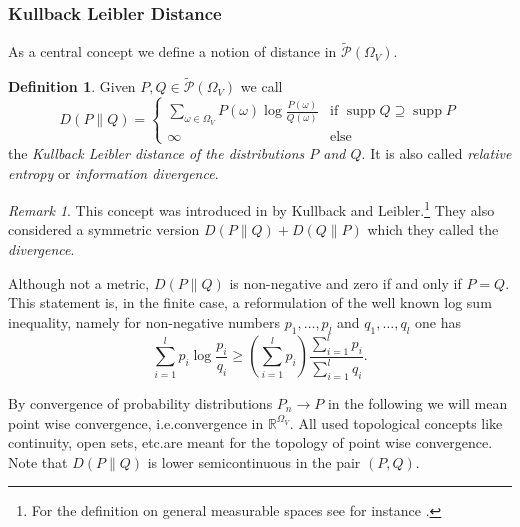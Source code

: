 \documentclass[12pt]{amsart}
\renewcommand{\supset}{\supseteq}
\DeclareMathOperator*{\supp}{supp}
\newcommand{\ie}{i.e.\;}  %
\newcommand{\etc}{etc.\;}
\theoremstyle{plain}%
\theoremstyle{definition}
\newtheorem{defn}[thm]{Definition}
\theoremstyle{remark}
\newtheorem*{rem}{Remark}
\begin{document}
\subsubsection{Kullback Leibler Distance}
As a central concept we define a notion of distance in
$\tilde{\mathcal{P}}(\Omega_V)$.
\begin{defn}\label{sec:kullb-leibl-dist-definition} Given $P,Q \in
  \tilde{\mathcal{P}}(\Omega_V)$ we call
  \begin{equation*}
  \label{eq:finitekullbackleibler}
  D ( P \parallel Q) =
  \begin{cases}
    \sum_{\omega\in\Omega_V} P(\omega) \log\frac{P(\omega)}{Q(\omega)}
    & \text{if } \supp Q \supset \supp P \\
    \infty & \text{else}
  \end{cases}
\end{equation*}
the \emph{Kullback Leibler distance of the distributions $P$ and $Q$}.
 It is also called \emph{relative
  entropy} or \emph{information
  divergence}.
\end{defn}
 
\begin{rem}
  This concept was introduced in \cite{kullbackleibler51} by Kullback
  and Leibler.\footnote{For the definition on general measurable
    spaces see for instance \cite{georgii88}.} They also considered a
  symmetric version $D(P\parallel Q) + D(Q\parallel P)$ which they
  called the \emph{divergence}.
\end{rem} 

Although not a metric, $D(P\parallel Q)$ is non-negative and zero if
and only if $P=Q$.  This statement is, in the finite case, a
reformulation of the well known log sum inequality, namely for
non-negative numbers $p_1,\ldots,p_l$ and $q_1,\ldots,q_l$ one has
\begin{equation*}
  \label{eq:logsuminequality}
  \sum_{i=1}^l p_i \log \frac{p_i}{q_i} \geq \left(\sum_{i=1}^l p_i \right) \frac{\sum_{i=1}^l p_i}{\sum_{i=1}^l q_i}. 
\end{equation*}

By convergence of probability distributions $P_n \to P$ in the
following we will mean point wise convergence, \ie convergence in
$\mathbb{R}^{\Omega_V}$. All used topological concepts like
continuity, open sets, \etc are meant for the topology of point wise
convergence.  Note that $D(P\parallel Q)$ is lower semicontinuous in the pair
$(P,Q)$.
\end{document}
